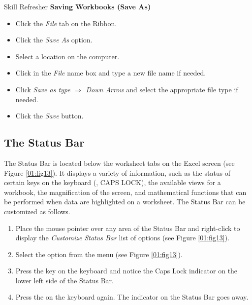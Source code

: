 \begin{center}
	\begin{sklbox}{Skill Refresher}
		\textbf{Saving Workbooks (Save As)}
		\\
		\begin{itemize}
			\setlength{\itemsep}{0pt}
			\setlength{\parskip}{0pt}
			\setlength{\parsep}{0pt}
			
			\item Click the \textit{File} tab on the Ribbon.
			\item Click the \textit{Save As} option.
			\item Select a location on the computer.
			\item Click in the \textit{File} name box and type a new file name if needed.
			\item Click \textit{Save as type $ \Rightarrow $ Down Arrow} and select the appropriate file type if needed.
			\item Click the \textit{Save} button.
		
		\end{itemize}
	\end{sklbox}
\end{center}

\subsection{The Status Bar}

The Status Bar is located below the worksheet tabs on the Excel screen (see Figure \ref{01:fig13}). It displays a variety of information, such as the status of certain keys on the keyboard (\eg, CAPS LOCK), the available views for a workbook, the magnification of the screen, and mathematical functions that can be performed when data are highlighted on a worksheet. The Status Bar can be customized as follows.

\begin{enumbox}
	\begin{enumerate}
		\item Place the mouse pointer over any area of the Status Bar and right-click to display the \textit{Customize Status Bar} list of options (see Figure \ref{01:fig13}).
		\item Select the  option from the menu (see Figure \ref{01:fig13}).
		\item Press the  key on the keyboard and notice the Caps Lock indicator on the lower left side of the Status Bar.
		\item Press the  on the keyboard again. The indicator on the Status Bar goes away.
	\end{enumerate}
\end{enumbox}

